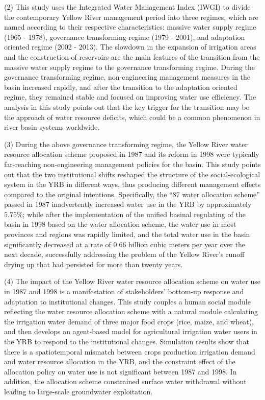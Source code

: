 \begin{eabstract}
  (2) This study uses the Integrated Water Management Index (IWGI) to divide the contemporary Yellow River management period into three regimes, which are named according to their respective characteristics: massive water supply regime (1965 - 1978), governance transforming regime (1979 - 2001), and adaptation oriented regime (2002 - 2013). The slowdown in the expansion of irrigation areas and the construction of reservoirs are the main features of the transition from the massive water supply regime to the governance transforming regime. During the governance transforming regime, non-engineering management measures in the basin increased rapidly, and after the transition to the adaptation oriented regime, they remained stable and focused on improving water use efficiency. The analysis in this study points out that the key trigger for the transition may be the approach of water resource deficits, which could be a common phenomenon in river basin systems worldwide.

  (3) During the above governance transforming regime, the Yellow River water resource allocation scheme proposed in 1987 and its reform in 1998 were typically far-reaching non-engineering management policies for the basin. 
  This study points out that the two institutional shifts reshaped the structure of the social-ecological system in the YRB in different ways, thus producing different management effects compared to the original intentions. Specifically, the ``87 water allocation scheme'' passed in 1987 inadvertently increased water use in the YRB by approximately $5.75\%$; while after the implementation of the unified basinal regulating of the basin in 1998 based on the water allocation scheme, the water use in most provinces and regions was rapidly limited, and the total water use in the basin significantly decreased at a rate of 0.66 billion cubic meters per year over the next decade, successfully addressing the problem of the Yellow River's runoff drying up that had persisted for more than twenty years.

  (4) The impact of the Yellow River water resource allocation scheme on water use in 1987 and 1998 is a manifestation of stakeholders' bottom-up response and adaptation to institutional changes. 
  This study couples a human social module reflecting the water resource allocation scheme with a natural module calculating the irrigation water demand of three major food crops (rice, maize, and wheat), and then develops an agent-based model for agricultural irrigation water users in the YRB to respond to the institutional changes. 
  Simulation results show that there is a spatiotemporal mismatch between crops production irrigation demand and water resource allocation in the YRB, and the constraint effect of the allocation policy on water use is not significant between 1987 and 1998. 
  In addition, the allocation scheme constrained surface water withdrawal without leading to large-scale groundwater exploitation.


\end{eabstract}
